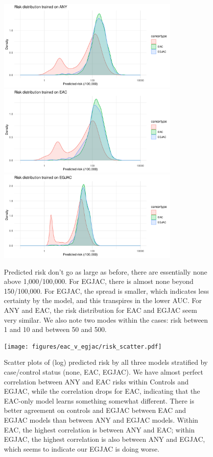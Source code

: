 \documentclass[12pt]{article}
\begin{document}
\begin{figure}[h]
\centering
\includegraphics[width=0.8\textwidth]{figures/eac_v_egjac/risk_distribution_ANY.pdf}
\includegraphics[width=0.8\textwidth]{figures/eac_v_egjac/risk_distribution_EAC.pdf}
\includegraphics[width=0.8\textwidth]{figures/eac_v_egjac/risk_distribution_EGJAC.pdf}
\caption{Predicted risk don't go as large as before, there are essentially none above 1,000/100,000. For EGJAC, there is almost none beyond 150/100,000.
For EGJAC, the spread is smaller, which indicates less certainty by the model, and this transpires in the lower AUC. For ANY and EAC, the risk
distribution for EAC and EGJAC seem very similar. We also note two modes within the cases: risk between 1 and 10 and between 50 and 500.}
\end{figure}


\begin{figure}[h]
\centering
\texttt{[image: figures/eac\_v\_egjac/risk\_scatter.pdf]}
\caption{Scatter plots of (log) predicted risk by all three models stratified by 
case/control status (none, EAC, EGJAC). We have almost perfect correlation between ANY and EAC risks within Controls and EGJAC,
while the correlation drops for EAC, indicating that the EAC-only model learns something somewhat different. There is better agreement
on controls and EGJAC between EAC and EGJAC models than between ANY and EGJAC models.
Within EAC, the highest correlation is
between ANY and EAC; within EGJAC, the highest correlation is also between ANY and EGJAC, which seems to indicate our EGJAC is doing worse.}
\end{figure}
\end{document}
